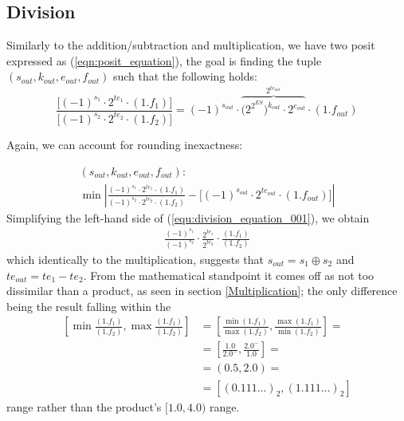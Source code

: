 \subsection{Division}



Similarly to the addition/subtraction and multiplication, we have two posit expressed as (\ref{eqn:posit_equation}), the goal is finding the tuple $(s_{out}, k_{out}, e_{out}, f_{out})$ such that
the following holds:
\begin{equation}\label{equ:division_equation_001}
    \frac{\big[ (-1)^{s_1} \cdot 2^{te_1} \cdot (1.f_1) \big]}{\big[ (-1)^{s_2} \cdot 2^{te_2} \cdot (1.f_2) \big]} = (-1)^{s_{out}} \cdot \overbrace{\big(2^{2^{ES}}\big)^{k_{out}} \cdot 2^{e_{out}}}^{2^{te_{out}}} \cdot (1.f_{out})
\end{equation}

Again, we can account for rounding inexactness:


\begin{equation}
\begin{gathered}
    (s_{out}, k_{out}, e_{out}, f_{out}): \\
    \min \left| \frac{ (-1)^{s_1} \cdot 2^{te_1} \cdot (1.f_1)}{(-1)^{s_2} \cdot 2^{te_2} \cdot (1.f_2)} - \big[ (-1)^{s_{out}} \cdot 2^{te_{out}} \cdot (1.f_{out}) \big] \right|
\end{gathered}
\end{equation}
Simplifying the left-hand side of (\ref{equ:division_equation_001}), we obtain
\begin{equation}
\begin{gathered}
    \frac{(-1)^{s_1}}{(-1)^{s_2}} \cdot \frac{2^{te_1}}{2^{te_2}} \cdot \frac{(1.f_1)}{(1.f_2)}
\end{gathered}
\end{equation}
which identically to the multiplication, suggests that $s_{out} = s_1 \oplus s_2$ and $te_{out} = te_1 - te_2$.
From the mathematical standpoint it comes off as not too dissimilar than a product, as seen in section \ref{Multiplication}; the only difference being the result falling within the
\begin{equation}\label{equ:min_max_frac_0010032}
\begin{aligned}
\left[\min{\frac{(1.f_1)}{(1.f_2)}}, \max{\frac{(1.f_1)}{(1.f_2)}} \right] &= \left[\frac{\min{(1.f_1)}}{\max{(1.f_2)}}, \frac{\max{(1.f_1)}}{\min{(1.f_2)}} \right] = \\
&= \left[\frac{1.0}{2.0^{-}}, \frac{2.0^{-}}{1.0} \right] =\\
&= \left(0.5, 2.0 \right) = \\
&= \left[(0.111\dots)_2, (1.111\dots)_2 \right]
\end{aligned}
\end{equation}
range rather than the product's $[1.0, 4.0)$ range.


